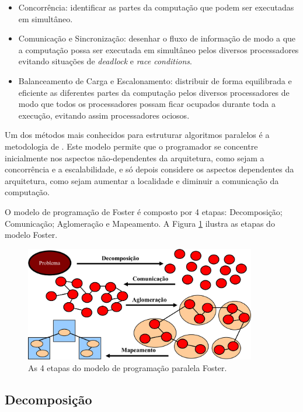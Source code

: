 \begin{itemize}
	\item Concorrência: identificar as partes da computação que podem ser executadas em simultâneo.

	\item Comunicação e Sincronização: desenhar o fluxo de informação de modo a que a computação possa ser executada em simultâneo pelos diversos processadores evitando situações de \textit{deadlock} e \textit{race conditions}.

	\item Balanceamento de Carga e Escalonamento: distribuir de forma equilibrada e eficiente as diferentes partes da computação pelos diversos processadores de modo que todos os processadores possam ficar ocupados durante toda a execução, evitando assim processadores ociosos.
\end{itemize}


Um dos métodos mais conhecidos para estruturar algoritmos paralelos é a metodologia de \cite{bib:foster1995designing}. Este modelo permite que o programador se concentre inicialmente nos aspectos não-dependentes da arquitetura, como sejam a concorrência e a escalabilidade, e só depois considere os aspectos dependentes da arquitetura, como sejam aumentar a localidade e diminuir a comunicação da computação.

O modelo de programação de Foster é composto por 4 etapas: Decomposição; Comunicação; Aglomeração e Mapeamento. A Figura \ref{fig:modelo_foster} ilustra as etapas do modelo Foster.

\begin{figure}[htbp]
	\centering
	\includegraphics[width=0.9\textwidth]{fig/modelo_foster.png}
	\caption{As 4 etapas do modelo de programação paralela Foster.} 
	\label{fig:modelo_foster}
\end{figure}


\subsection{Decomposição}

